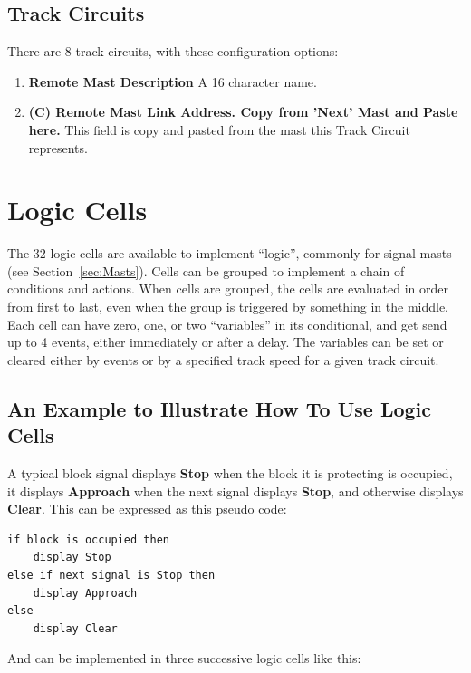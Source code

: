 \subsection{Track Circuits}

There are 8 track circuits, with these configuration options:

\begin{enumerate}
\item \textbf{Remote Mast Description} A 16 character name.
\item \textbf{(C) Remote Mast Link Address. Copy from 'Next' Mast and Paste 
here.} This field is copy and pasted from the mast this Track Circuit 
represents.
\end{enumerate}

\section{Logic Cells}
\label{sec:LogicCells}

The 32 logic cells are available to implement ``logic'', commonly for signal 
masts (see Section~\ref{sec:Masts}).  Cells can be grouped to implement a 
chain of conditions and actions.  When cells are grouped, the cells are 
evaluated in order from first to last, even when the group is triggered by 
something in the middle.  Each cell can have zero, one, or two ``variables'' 
in its conditional, and get send up to 4 events, either immediately or after a 
delay.  The variables can be set or cleared either by events or by a 
specified track speed for a given track circuit. 

\subsection{An Example to Illustrate How To Use Logic Cells}

A typical block signal displays \textbf{Stop} when the 
block it is protecting is occupied, it displays \textbf{Approach} when the 
next signal displays \textbf{Stop}, and otherwise displays \textbf{Clear}.  
This can be expressed as this pseudo code:

\begin{verbatim}
if block is occupied then
    display Stop
else if next signal is Stop then
    display Approach
else
    display Clear
\end{verbatim}

And can be implemented in three successive logic cells like this:

